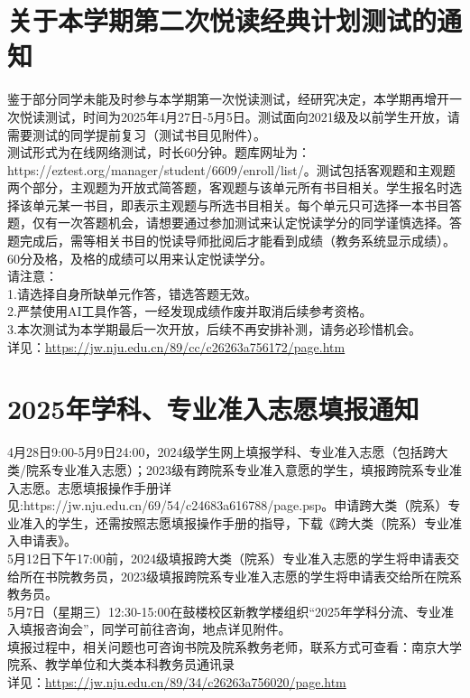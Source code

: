 \documentclass[letterpaper, 12pt]{article}
\begin{document}
\begin{multicols}{2}
\section{关于本学期第二次悦读经典计划测试的通知} %
鉴于部分同学未能及时参与本学期第一次悦读测试，经研究决定，本学期再增开一次悦读测试，时间为2025年4月27日-5月5日。测试面向2021级及以前学生开放，请需要测试的同学提前复习（测试书目见附件）。
\\测试形式为在线网络测试，时长60分钟。题库网址为：https://eztest.org/manager/student/6609/enroll/list/。测试包括客观题和主观题两个部分，主观题为开放式简答题，客观题与该单元所有书目相关。学生报名时选择该单元某一书目，即表示主观题与所选书目相关。每个单元只可选择一本书目答题，仅有一次答题机会，请想要通过参加测试来认定悦读学分的同学谨慎选择。答题完成后，需等相关书目的悦读导师批阅后才能看到成绩（教务系统显示成绩）。60分及格，及格的成绩可以用来认定悦读学分。
\\请注意：
\\1.请选择自身所缺单元作答，错选答题无效。
\\2.严禁使用AI工具作答，一经发现成绩作废并取消后续参考资格。
\\3.本次测试为本学期最后一次开放，后续不再安排补测，请务必珍惜机会。
\\详见：\url{https://jw.nju.edu.cn/89/cc/c26263a756172/page.htm}

\section{2025年学科、专业准入志愿填报通知} %
4月28日9:00-5月9日24:00，2024级学生网上填报学科、专业准入志愿（包括跨大类/院系专业准入志愿）；2023级有跨院系专业准入意愿的学生，填报跨院系专业准入志愿。志愿填报操作手册详见:https://jw.nju.edu.cn/69/54/c24683a616788/page.psp。申请跨大类（院系）专业准入的学生，还需按照志愿填报操作手册的指导，下载《跨大类（院系）专业准入申请表》。
\\5月12日下午17:00前，2024级填报跨大类（院系）专业准入志愿的学生将申请表交给所在书院教务员，2023级填报跨院系专业准入志愿的学生将申请表交给所在院系教务员。
\\5月7日（星期三）12:30-15:00在鼓楼校区新教学楼组织“2025年学科分流、专业准入填报咨询会”，同学可前往咨询，地点详见附件。
\\填报过程中，相关问题也可咨询书院及院系教务老师，联系方式可查看：南京大学院系、教学单位和大类本科教务员通讯录
\\详见：\url{https://jw.nju.edu.cn/89/34/c26263a756020/page.htm}


\end{multicols}
\end{document}
